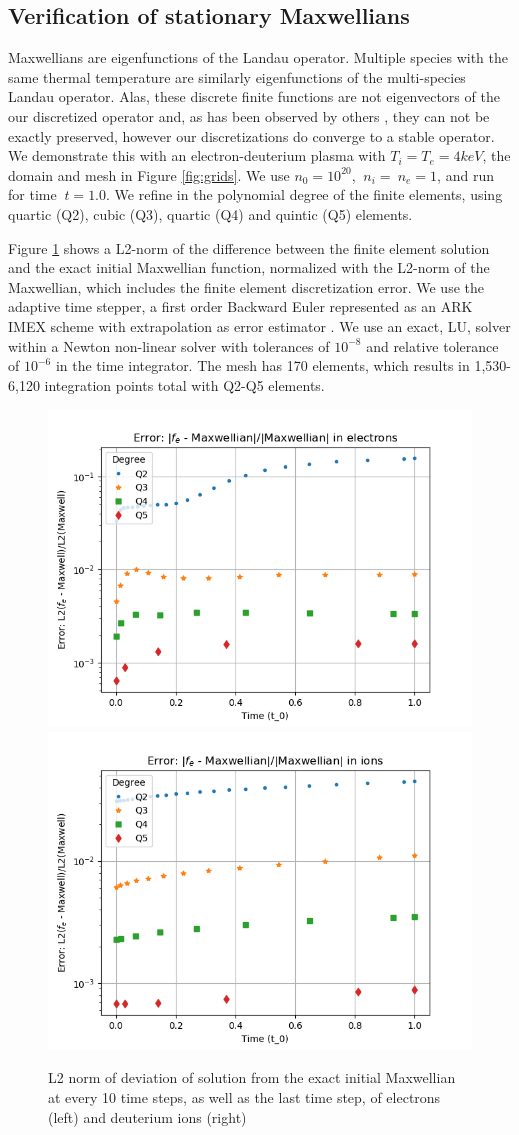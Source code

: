 \documentclass[12pt]{siamart}
\begin{document}
\subsection{Verification of stationary Maxwellians}
Maxwellians are eigenfunctions of the Landau operator.
Multiple species with the same thermal temperature are similarly eigenfunctions of the multi-species Landau operator.
Alas, these discrete finite functions are not eigenvectors of the our discretized operator and, as has been observed by others \cite{Hager2016}, they can not be exactly preserved, however our discretizations do converge to a stable operator.
We demonstrate this with an electron-deuterium plasma with  $T_i=T_e=4 keV$, the domain and mesh in Figure \ref{fig:grids}. 
We use $n_0=10^{20}$, $\ n_i = \ n_e = 1$, and run for time $\ t = 1.0$.
We refine in the polynomial degree of the finite elements, using quartic (Q2), cubic (Q3), quartic (Q4) and quintic (Q5) elements.

Figure \ref{fig:stable} shows a L2-norm of the difference between the finite element solution and the exact initial Maxwellian function, normalized with the L2-norm of the Maxwellian, which includes the finite element discretization error.
We use the adaptive time stepper, a first order Backward Euler represented as an ARK IMEX scheme with extrapolation as error estimator \cite{abhyankar2018petscts}.
We use an exact, LU, solver within a Newton non-linear solver with tolerances of $10^{-8}$ and relative tolerance of $10^{-6}$ in the time integrator.
The mesh has 170 elements, which results in 1,530-6,120 integration points total with Q2-Q5 elements.
\begin{figure}[htbp]
\begin{center}
\includegraphics[width=.4\linewidth]{e_L2error.png}
\includegraphics[width=.4\linewidth]{i_L2error.png}
\caption{L2 norm of deviation of solution from the exact initial Maxwellian at every 10 time steps, as well as the last time step, of electrons (left) and deuterium ions (right)}
\label{fig:stable}
\end{center}
\end{figure}
\end{document}
